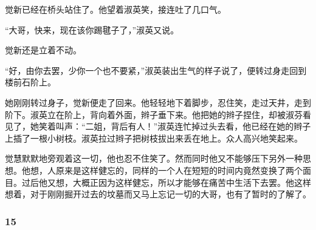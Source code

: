 \par 觉新已经在桥头站住了。他望着淑英笑，接连吐了几口气。
\par “大哥，快来，现在该你踢毽子了，”淑英又说。
\par 觉新还是立着不动。
\par “好，由你去罢，少你一个也不要紧，”淑英装出生气的样子说了，便转过身走回到楼前石阶上。
\par 她刚刚转过身子，觉新便走了回来。他轻轻地下着脚步，忍住笑，走过天井，走到阶下。淑英立在阶上，背向着外面，辫子垂下来。他把她的辫子捏住，却被淑芬看见了，她笑着叫声：“二姐，背后有人！”淑英连忙掉过头去看，他已经在她的辫子上插了一根小树枝。淑英拉过辫子把树枝拔出来丢在地上。众人高兴地笑起来。
\par 觉慧默默地旁观着这一切，他也忍不住笑了。然而同时他又不能够压下另外一种思想。他想，人原来是这样健忘的，同样的一个人在短短的时间内竟然变换了两个面目。过后他又想，大概正因为这样健忘，所以才能够在痛苦中生活下去罢。他这样想着，对于刚刚掘开过去的坟墓而又马上忘记一切的大哥，也有了暂时的了解了。



\subsubsection*{15}

